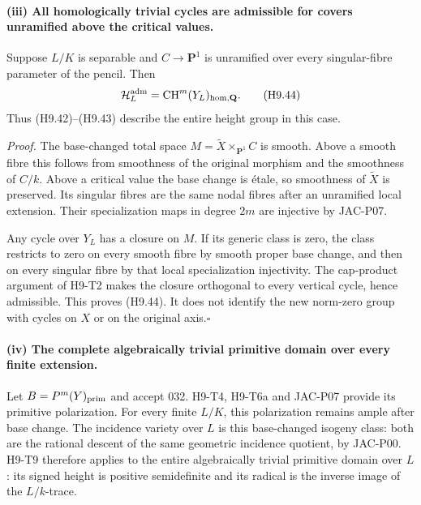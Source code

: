 \paragraph{(iii) All homologically trivial cycles are admissible for covers unramified above the critical values.}
Suppose $L/K$ is separable and $C\to\mathbf P^1$ is unramified over
every singular-fibre parameter of the pencil. Then
\[
 \mathcal H_L^{\rm adm}
       =\operatorname{CH}^m(Y_L)_{\rm hom,\mathbf Q}.          \tag{H9.44}
\]
Thus (H9.42)--(H9.43) describe the entire height group in this case.

\emph{Proof.} The base-changed total space
$M=\widetilde X\times_{\mathbf P^1}C$ is smooth. Above a smooth
fibre this follows from smoothness of the original morphism and the
smoothness of $C/k$. Above a critical value the base change is \'etale,
so smoothness of $\widetilde X$ is preserved. Its singular fibres are
the same nodal fibres after an unramified local extension. Their
specialization maps in degree $2m$ are injective by JAC-P07.

Any cycle over $Y_L$ has a closure on $M$. If its generic class is zero,
the class restricts to zero on every smooth fibre by smooth proper base
change, and then on every singular fibre by that local specialization
injectivity. The cap-product argument of H9-T2 makes the closure
orthogonal to every vertical cycle, hence admissible. This proves
(H9.44). It does not identify the new norm-zero group with cycles on
$X$ or on the original axis.\hfill$\square$

\paragraph{(iv) The complete algebraically trivial primitive domain over every finite extension.}
Let $B=P^m(Y)_{\rm prim}$ and accept 032. H9-T4, H9-T6a and JAC-P07
provide its primitive polarization. For every finite $L/K$, this
polarization remains ample after base change. The incidence variety
over $L$ is this base-changed isogeny class: both are the rational
descent of the same geometric incidence quotient, by JAC-P00.
H9-T9 therefore applies
to the entire algebraically trivial primitive domain over $L$: its
signed height is positive semidefinite and its radical is the inverse
image of the $L/k$-trace.

